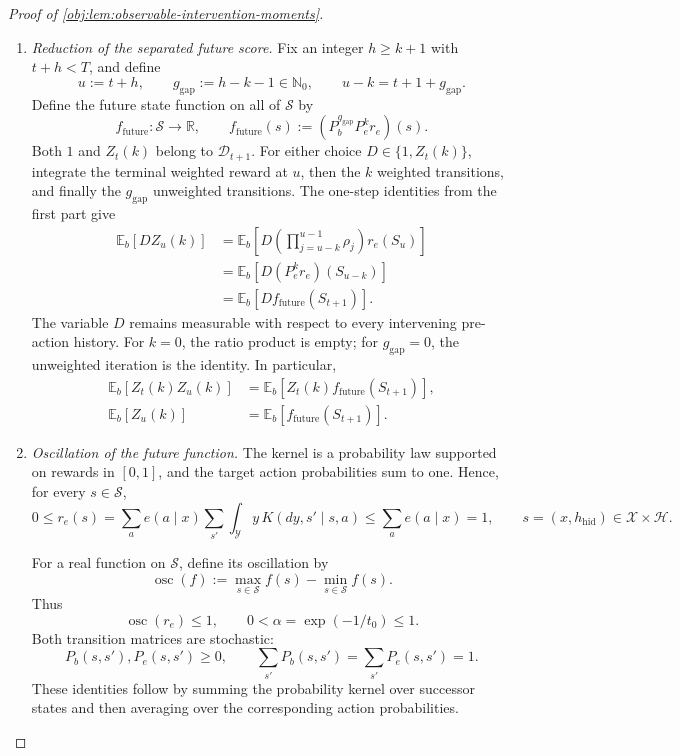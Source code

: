\begin{proof}[Proof of \cref{obj:lem:observable-intervention-moments}]
\begin{enumerate}
\item \emph{Reduction of the separated future score.}
Fix an integer \(h\ge k+1\) with \(t+h<T\), and define
\[
u:=t+h,\qquad
g_{\mathrm{gap}}:=h-k-1\in\mathbb N_0,
\qquad
u-k=t+1+g_{\mathrm{gap}}.
\]
Define the future state function on all of \(\mathcal S\) by
\[
f_{\mathrm{future}}:\mathcal S\longrightarrow\mathbb R,
\qquad
f_{\mathrm{future}}(s)
:=
(P_b^{g_{\mathrm{gap}}}P_e^kr_e)(s).
\]
Both \(1\) and \(Z_t(k)\) belong to \(\mathcal D_{t+1}\). For either choice \(D\in\{1,Z_t(k)\}\), integrate the terminal weighted reward at \(u\), then the \(k\) weighted transitions, and finally the \(g_{\mathrm{gap}}\) unweighted transitions. The one-step identities from the first part give
\[
\begin{aligned}
\mathbb E_b[DZ_u(k)]
&=
\mathbb E_b\!\left[
D\left(\prod_{j=u-k}^{u-1}\rho_j\right)r_e(S_u)
\right]\\
&=
\mathbb E_b[D(P_e^kr_e)(S_{u-k})]\\
&=
\mathbb E_b[D f_{\mathrm{future}}(S_{t+1})].
\end{aligned}
\]
The variable \(D\) remains measurable with respect to every intervening pre-action history. For \(k=0\), the ratio product is empty; for \(g_{\mathrm{gap}}=0\), the unweighted iteration is the identity. In particular,
\[
\begin{aligned}
\mathbb E_b[Z_t(k)Z_u(k)]
&=\mathbb E_b[Z_t(k)f_{\mathrm{future}}(S_{t+1})],\\
\mathbb E_b[Z_u(k)]
&=\mathbb E_b[f_{\mathrm{future}}(S_{t+1})].
\end{aligned}
\]

\item \emph{Oscillation of the future function.}
The kernel is a probability law supported on rewards in \([0,1]\), and the target action probabilities sum to one. Hence, for every \(s\in\mathcal S\),
\[
0
\le r_e(s)
=\sum_a e(a\mid x)\sum_{s'}\int_{\mathcal Y}y\,K(dy,s'\mid s,a)
\le\sum_a e(a\mid x)
=1,
\qquad s=(x,h_{\mathrm{hid}})\in\mathcal X\times\mathcal H.
\]

For a real function on \(\mathcal S\), define its oscillation by
\[
\operatorname{osc}(f):=\max_{s\in\mathcal S}f(s)-\min_{s\in\mathcal S}f(s).
\]
Thus
\[
\operatorname{osc}(r_e)\le1,
\qquad
0<\alpha=\exp(-1/t_0)\le1.
\]
Both transition matrices are stochastic:
\[
P_b(s,s'),P_e(s,s')\ge0,\qquad
\sum_{s'}P_b(s,s')=\sum_{s'}P_e(s,s')=1.
\]
These identities follow by summing the probability kernel over successor states and then averaging over the corresponding action probabilities.


\end{enumerate}
\end{proof}
